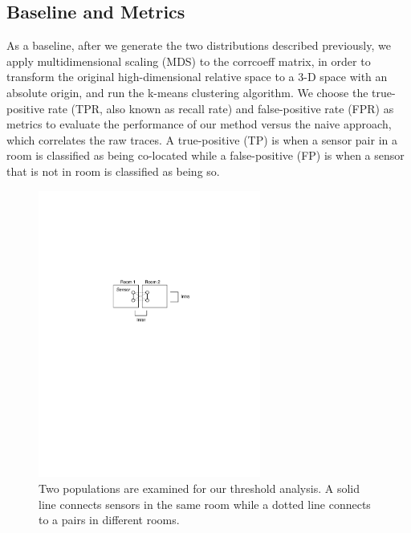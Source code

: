 \subsection{Baseline and Metrics}

As a baseline, after we generate the two distributions described previously, we apply multidimensional scaling (MDS) to the corrcoeff matrix, in order to transform the original high-dimensional relative space to a 3-D space with an absolute origin, and run the k-means clustering algorithm.
We choose the true-positive rate (TPR, also known as recall rate) and false-positive rate (FPR) as metrics to evaluate the performance of our method versus the naive approach, which correlates the raw traces. A true-positive (TP) is when a sensor pair in a room is classified as being co-located 
while a false-positive (FP) is when a sensor that is not in room is classified as being so.

\begin{figure}[h!]
\centering
	\includegraphics[width=0.65\textwidth]{figs/Inter_intra_relationships}
\caption{Two populations are examined for our threshold analysis.  A solid line connects sensors in the same room while a dotted line connects
 to a pairs in different rooms.}
\label{fig:group}
\end{figure}


